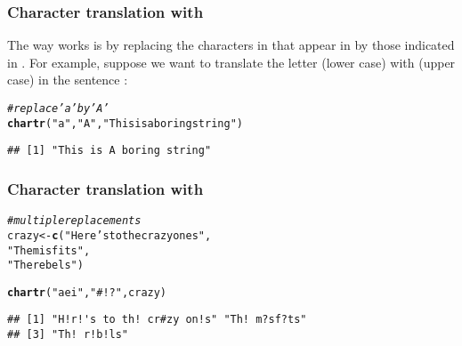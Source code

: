 \documentclass[12pt]{beamer}\usepackage[]{graphicx}\usepackage[]{color}
\makeatletter
\newcommand{\hlstr}[1]{\textcolor[rgb]{0.192,0.494,0.8}{#1}}%
\newcommand{\hlcom}[1]{\textcolor[rgb]{0.678,0.584,0.686}{\textit{#1}}}%
\newcommand{\hlstd}[1]{\textcolor[rgb]{0.345,0.345,0.345}{#1}}%
\newcommand{\hlkwb}[1]{\textcolor[rgb]{0.69,0.353,0.396}{#1}}%
\newcommand{\hlkwd}[1]{\textcolor[rgb]{0.737,0.353,0.396}{\textbf{#1}}}%
\newenvironment{kframe}{%
 \def\at@end@of@kframe{}%
 \ifinner\ifhmode%
  \def\at@end@of@kframe{\end{minipage}}%
  \begin{minipage}{\columnwidth}%
 \fi\fi%
 \def\FrameCommand##1{\hskip\@totalleftmargin \hskip-\fboxsep
 \colorbox{shadecolor}{##1}\hskip-\fboxsep
     \hskip-\linewidth \hskip-\@totalleftmargin \hskip\columnwidth}%
 \MakeFramed {\advance\hsize-\width
   \@totalleftmargin\z@ \linewidth\hsize
   \@setminipage}}%
 {\par\unskip\endMakeFramed%
 \at@end@of@kframe}
\newenvironment{knitrout}{}{} %
\makeatother
\begin{document}

\begin{frame}[fragile]
\frametitle{Character translation with }

The way  works is by replacing the characters in  that appear in  by those indicated in . For example, suppose we want to translate the letter  (lower case) with  (upper case) in the sentence :
\begin{knitrout}\footnotesize
{}\color{fgcolor}\begin{kframe}
\begin{alltt}
\hlcom{# replace 'a' by 'A'}
\hlkwd{chartr}\hlstd{(}\hlstr{"a"}\hlstd{,} \hlstr{"A"}\hlstd{,} \hlstr{"This is a boring string"}\hlstd{)}
\end{alltt}
\begin{verbatim}
## [1] "This is A boring string"
\end{verbatim}
\end{kframe}
\end{knitrout}

\end{frame}


\begin{frame}[fragile]
\frametitle{Character translation with }

\begin{knitrout}\footnotesize
{}\color{fgcolor}\begin{kframe}
\begin{alltt}
\hlcom{# multiple replacements}
\hlstd{crazy} \hlkwb{<-} \hlkwd{c}\hlstd{(}\hlstr{"Here's to the crazy ones"}\hlstd{,}
           \hlstr{"The misfits"}\hlstd{,}
           \hlstr{"The rebels"}\hlstd{)}

\hlkwd{chartr}\hlstd{(}\hlstr{"aei"}\hlstd{,} \hlstr{"#!?"}\hlstd{, crazy)}
\end{alltt}
\begin{verbatim}
## [1] "H!r!'s to th! cr#zy on!s" "Th! m?sf?ts"             
## [3] "Th! r!b!ls"
\end{verbatim}
\end{kframe}
\end{knitrout}

\end{frame}
\end{document}

